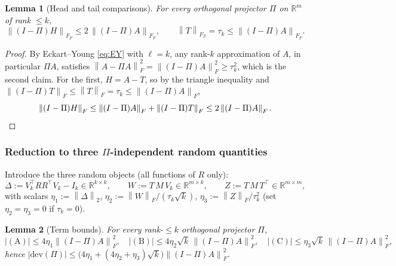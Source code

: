 \documentclass{amsart}
\newtheorem{lemma}{Lemma}
\theoremstyle{definition}
\newcommand{\R}{\mathbb{R}}
\newcommand{\Frob}[1]{\left\lVert #1\right\rVert_F}
\newcommand{\Op}[1]{\left\lVert #1\right\rVert_2}
\begin{document}
\begin{lemma}[Head and tail comparisons]\label{lem:geomcmp}
For every orthogonal projector $\Pi$ on $\R^m$ of rank $\le k$,
\begin{equation}\label{eq:geomcmp}
\Frob{(I-\Pi)H}_F\le 2\,\Frob{(I-\Pi)A}_F,\qquad
\Frob{T}_F=\tau_k\le\Frob{(I-\Pi)A}_F .
\end{equation}
\end{lemma}
\begin{proof}
By Eckart--Young \eqref{eq:EY} with $\ell=k$, any rank-$k$ approximation of $A$,
in particular $\Pi A$, satisfies $\Frob{A-\Pi A}^2=\Frob{(I-\Pi)A}^2\ge\tau_k^2$,
which is the second claim. For the first, $H=A-T$, so by the triangle inequality
and $\Frob{(I-\Pi)T}\le\Frob{T}=\tau_k\le\Frob{(I-\Pi)A}$,
\[
\Frob{(I-\Pi)H}\le\Frob{(I-\Pi)A}+\Frob{(I-\Pi)T}\le2\Frob{(I-\Pi)A}. \qedhere
\]
\end{proof}

\subsubsection*{Reduction to three $\Pi$-independent random quantities}

Introduce the three random objects (all functions of $R$ only):
\begin{equation}\label{eq:threequant}
\Delta:=V_k^\top RR^\top V_k-I_k\in\R^{k\times k},\qquad
W:=T\,M\,V_k\in\R^{m\times k},\qquad
Z:=T\,M\,T^\top\in\R^{m\times m},
\end{equation}
with scalars $\eta_1:=\Op{\Delta}$, $\eta_2:=\Frob{W}/(\tau_k\sqrt k)$,
$\eta_3:=\Frob{Z}/\tau_k^2$ (set $\eta_2=\eta_3=0$ if $\tau_k=0$).

\begin{lemma}[Term bounds]\label{lem:termbounds}
For every rank-$\le k$ orthogonal projector $\Pi$,
\[
|(\mathrm A)|\le 4\eta_1\Frob{(I-\Pi)A}^2,\quad
|(\mathrm B)|\le 4\eta_2\sqrt k\,\Frob{(I-\Pi)A}^2,\quad
|(\mathrm C)|\le \eta_3\sqrt k\,\Frob{(I-\Pi)A}^2,
\]
hence $|\mathrm{dev}(\Pi)|\le\big(4\eta_1+(4\eta_2+\eta_3)\sqrt k\big)\Frob{(I-\Pi)A}^2$.
\end{lemma}
\end{document}
